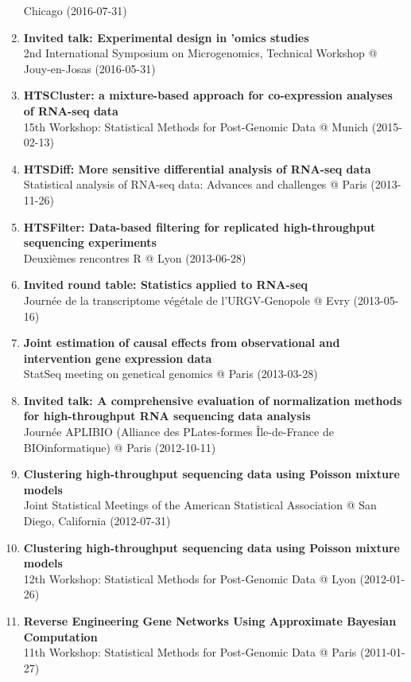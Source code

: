\documentclass[11pt, a4paper]{awesome-cv}
\begin{document}
\begin{enumerate}
  Chicago (2016-07-31)
\item
  \textbf{Invited talk: Experimental design in 'omics studies}\\
  2nd International Symposium on Microgenomics, Technical Workshop @
  Jouy-en-Josas (2016-05-31)
\item
  \textbf{HTSCluster: a mixture-based approach for co-expression
  analyses of RNA-seq data}\\
  15th Workshop: Statistical Methods for Post-Genomic Data @ Munich
  (2015-02-13)
\item
  \textbf{HTSDiff: More sensitive differential analysis of RNA-seq
  data}\\
  Statistical analysis of RNA-seq data: Advances and challenges @ Paris
  (2013-11-26)
\item
  \textbf{HTSFilter: Data-based filtering for replicated high-throughput
  sequencing experiments}\\
  Deuxièmes rencontres R @ Lyon (2013-06-28)
\item
  \textbf{Invited round table: Statistics applied to RNA-seq}\\
  Journée de la transcriptome végétale de l'URGV-Genopole @ Evry
  (2013-05-16)
\item
  \textbf{Joint estimation of causal effects from observational and
  intervention gene expression data}\\
  StatSeq meeting on genetical genomics @ Paris (2013-03-28)
\item
  \textbf{Invited talk: A comprehensive evaluation of normalization
  methods for high-throughput RNA sequencing data analysis}\\
  Journée APLIBIO (Alliance des PLates-formes Île-de-France de
  BIOinformatique) @ Paris (2012-10-11)
\item
  \textbf{Clustering high-throughput sequencing data using Poisson
  mixture models}\\
  Joint Statistical Meetings of the American Statistical Association @
  San Diego, California (2012-07-31)
\item
  \textbf{Clustering high-throughput sequencing data using Poisson
  mixture models}\\
  12th Workshop: Statistical Methods for Post-Genomic Data @ Lyon
  (2012-01-26)
\item
  \textbf{Reverse Engineering Gene Networks Using Approximate Bayesian
  Computation}\\
  11th Workshop: Statistical Methods for Post-Genomic Data @ Paris
  (2011-01-27)

\end{enumerate}
\end{document}
